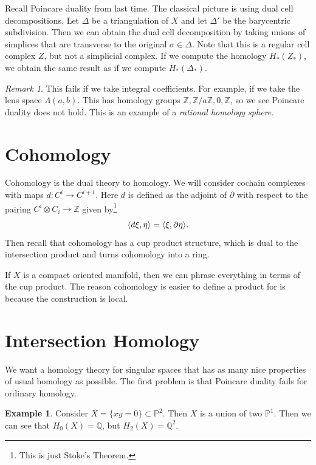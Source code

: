 \documentclass[leqno, openany]{memoir}
\DeclarePairedDelimiter{\gen}{\langle}{\rangle}
\theoremstyle{definition}
\newtheorem{exm}[thm]{Example}
\theoremstyle{remark}
\newtheorem{rmk}[thm]{Remark}
\theoremstyle{plain}
\theoremstyle{definition}
\theoremstyle{remark}
\newcommand{\Z}{\mathbb{Z}}
\newcommand{\Q}{\mathbb{Q}}
\renewcommand{\P}{\mathbb{P}}
\begin{document}
Recall Poincare duality from last time. The classical picture is using dual
cell decompositions. Let $\Delta$ be a triangulation of $X$ and let $\Delta'$
be the barycentric subdivision. Then we can obtain the dual cell decomposition
by taking unions of simplices that are transverse to the original $\sigma \in
\Delta$. Note that this is a regular cell complex $Z$, but not a simplicial
complex. If we compute the homology $H_*(Z_*)$, we obtain the same result as if
we compute $H_*(\Delta_*)$.

\begin{rmk} This fails if we take integral coefficients. For example, if we
    take the lens space $\Lambda(a,b)$. This has homology groups $\Z, \Z/a\Z,
    0, \Z$, so we see Poincare duality does not hold. This is an example of a
    \textit{rational homology sphere}.  \end{rmk}

\section{Cohomology}%

Cohomology is the dual theory to homology. We will consider cochain complexes
with maps $d: C^i \to C^{i+1}$. Here $d$ is defined as the adjoint of
$\partial$ with respect to the pairing $C^i \otimes C_i \to \Z$ given
by\footnote{This is just Stoke's Theorem.} \[ \gen{ d \xi, \eta } = \gen{\xi,
\partial \eta}. \] Then recall that cohomology has a cup product structure,
which is dual to the intersection product and turns cohomology into a ring.

If $X$ is a compact oriented manifold, then we can phrase everything in terms
of the cup product. The reason cohomology is easier to define a product for is
because the construction is local.

\section{Intersection Homology}%

We want a homology theory for singular spaces that has as many nice properties
of usual homology as possible. The first problem is that Poincare duality fails
for ordinary homology.

\begin{exm} Consider $X = \{ xy = 0 \} \subset \P^2$. Then $X$ is a union of
two $\P^1$. Then we can see that $H_0(X) = \Q$, but $H_2(X) = \Q^2$.  \end{exm}
\end{document}
